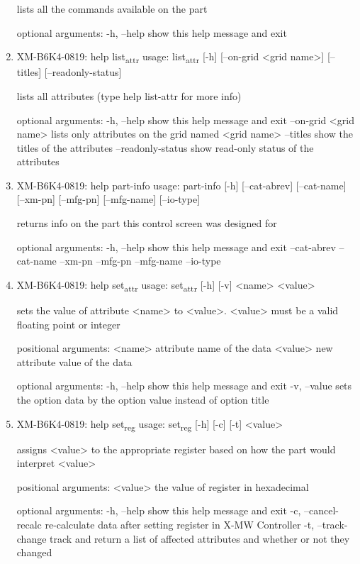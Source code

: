 \documentclass[11pt]{article}
\begin{document}
\begin{enumerate}
lists all the commands available on the part

optional arguments:
  -h, --help  show this help message and exit

\item XM-B6K4-0819: help list\textsubscript{attr}
\label{sec:org40dc4fa}
usage: list\textsubscript{attr} [-h] [--on-grid <grid name>] [--titles] [--readonly-status]

lists all attributes (type help list-attr for more info)

optional arguments:
  -h, --help            show this help message and exit
  --on-grid <grid name>
                        lists only attributes on the grid named <grid name>
  --titles              show the titles of the attributes
  --readonly-status     show read-only status of the attributes

\item XM-B6K4-0819: help part-info
\label{sec:org3a8ca84}
usage: part-info  [-h] [--cat-abrev] [--cat-name] [--xm-pn] [--mfg-pn] [--mfg-name]
        [--io-type]

returns info on the part this control screen was designed for

optional arguments:
  -h, --help   show this help message and exit
  --cat-abrev
  --cat-name
  --xm-pn
  --mfg-pn
  --mfg-name
  --io-type

\item XM-B6K4-0819: help set\textsubscript{attr}
\label{sec:orgcffaa17}
usage: set\textsubscript{attr} [-h] [-v] <name> <value>

sets the value of attribute <name> to <value>. <value> must be a valid
floating point or integer

positional arguments:
  <name>       attribute name of the data
  <value>      new attribute value of the data

optional arguments:
  -h, --help   show this help message and exit
  -v, --value  sets the option data by the option value instead of option
               title

\item XM-B6K4-0819: help set\textsubscript{reg}
\label{sec:org84e793c}
usage: set\textsubscript{reg} [-h] [-c] [-t] <value>

assigns <value> to the appropriate register based on how the part would
interpret <value>

positional arguments:
  <value>              the value of register in hexadecimal

optional arguments:
  -h, --help           show this help message and exit
  -c, --cancel-recalc  re-calculate data after setting register in X-MW
                       Controller
  -t, --track-change   track and return a list of affected attributes and
                       whether or not they changed


\end{enumerate}
\end{document}
